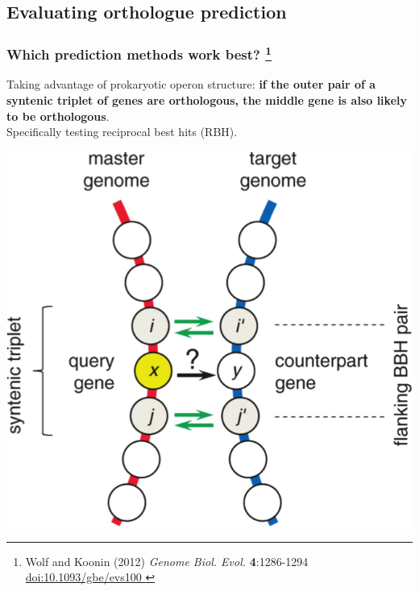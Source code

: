 
\subsection{Evaluating orthologue prediction}

\begin{frame}
  \frametitle{Which prediction methods work best?
    \footnote{\tiny{Wolf and Koonin (2012) \textit{Genome Biol. Evol.} \textbf{4}:1286-1294 \href{http://dx.doi.org/10.1093/gbe/evs100}{doi:10.1093/gbe/evs100
    }}}
  }
  Taking advantage of prokaryotic operon structure: \textbf{if the outer pair of a syntenic triplet of genes are orthologous, the middle gene is also likely to be orthologous}.\\
  Specifically testing reciprocal best hits (RBH).
  \begin{center}
      \includegraphics[height=0.45\textheight]{images/syntenic_triplet} 
  \end{center}
\end{frame}

